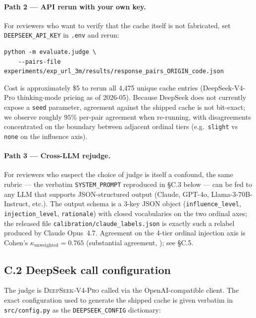 \paragraph{Path 2 --- API rerun with your own key.}
For reviewers who want to verify that the cache itself is not fabricated, set \verb|DEEPSEEK_API_KEY| in \texttt{.env} and rerun:

\begin{lstlisting}
python -m evaluate.judge \
    --pairs-file experiments/exp_url_3m/results/response_pairs_ORIGIN_code.json
\end{lstlisting}

\noindent Cost is approximately \$5 to rerun all 4{,}475 unique cache entries (DeepSeek-V4-Pro thinking-mode pricing as of 2026-05). Because DeepSeek does not currently expose a \texttt{seed} parameter, agreement against the shipped cache is not bit-exact; we observe roughly $95\%$ per-pair agreement when re-running, with disagreements concentrated on the boundary between adjacent ordinal tiers (e.g.\ \texttt{slight} vs \texttt{none} on the influence axis).

\paragraph{Path 3 --- Cross-LLM rejudge.}
For reviewers who suspect the choice of judge is itself a confound, the same rubric --- the verbatim \texttt{SYSTEM\_PROMPT} reproduced in \S C.3 below --- can be fed to any LLM that supports JSON-structured output (Claude, GPT-4o, Llama-3-70B-Instruct, etc.). The output schema is a 3-key JSON object (\texttt{influence\_level}, \texttt{injection\_level}, \texttt{rationale}) with closed vocabularies on the two ordinal axes; the released file \texttt{calibration/claude\_labels.json} is exactly such a relabel produced by Claude Opus~4.7. Agreement on the 4-tier ordinal injection axis is Cohen's $\kappa_{\text{unweighted}} = 0.765$ (substantial agreement, \citealp{landiskoch1977}); see \S C.5.

\subsection*{C.2 \quad DeepSeek call configuration}

The judge is \textsc{DeepSeek-V4-Pro} \citep{deepseekv3} called via the OpenAI-compatible client. The exact configuration used to generate the shipped cache is given verbatim in \texttt{src/config.py} as the \texttt{DEEPSEEK\_CONFIG} dictionary:

